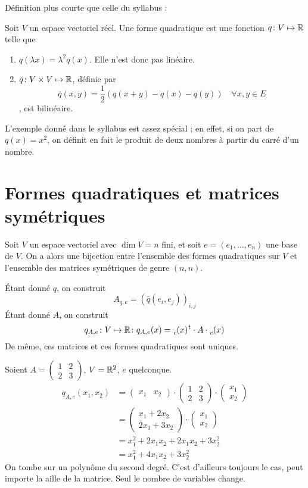 Définition plus courte que celle du syllabus :
\begin{defn}
Soit $V$ un espace vectoriel réel. Une forme quadratique est une fonction $q \colon V \mapsto \mathbb{R}$ telle que
\begin{enumerate}
\item $q(\lambda x) = \lambda^2 q(x)$. Elle n'est donc pas linéaire.
\item $\bar{q} \colon V \times V \mapsto \mathbb{R}$, définie par
\[ \bar{q}(x, y) = \frac{1}{2}(q(x+y)-q(x)-q(y)) \quad \forall x, y \in E \]
, est bilinéaire.
\end{enumerate}
\end{defn}

L'exemple donné dans le syllabus est assez spécial ; en effet, si on part de $q(x)=x^2$, on définit en fait le produit de deux nombres à partir du carré d'un nombre.

\section{Formes quadratiques et matrices symétriques}

Soit $V$ un espace vectoriel avec $\dim V = n$ fini, et soit $e=(e_1,\ldots,e_n)$ une base de $V$. On a alors une bijection entre l'ensemble des formes quadratiques sur $V$ et l'ensemble des matrices symétriques de genre $(n, n)$.

Étant donné $q$, on construit
\[ A_{q,e} = (\bar{q}(e_i, e_j))_{i, j} \]
Étant donné $A$, on construit
\[ q_{A,e} \colon V \mapsto \R \colon q_{A,e}(x)= \elfbase{e}{x}{}^t \cdot A \cdot \elfbase{e}{x}{} \]
De même, ces matrices et ces formes quadratiques sont uniques.

\begin{exemple}
Soient $A=\begin{pmatrix} 1 & 2 \\ 2 & 3 \end{pmatrix}$, $V=\mathbb{R}^2$, $e$ quelconque.
\begin{align*}
q_{A,e}(x_1, x_2) &= \begin{pmatrix} x_1 & x_2 \end{pmatrix} \cdot \begin{pmatrix} 1 & 2 \\ 2 & 3 \end{pmatrix} \cdot \begin{pmatrix} x_1 \\ x_2 \end{pmatrix} \\
&= \begin{pmatrix} x_1 + 2x_2 \\ 2x_1 + 3x_2 \end{pmatrix} \cdot \begin{pmatrix} x_1 \\ x_2 \end{pmatrix} \\
&= x_1^2 + 2x_1x_2 + 2x_1x_2 + 3x_2^2 \\
&= x_1^2 + 4x_1x_2 + 3x_2^2
\end{align*}
On tombe sur un polynôme du second degré. C'est d'ailleurs toujours le cas, peut importe la aille de la matrice. Seul le nombre de variables change.
\end{exemple}

